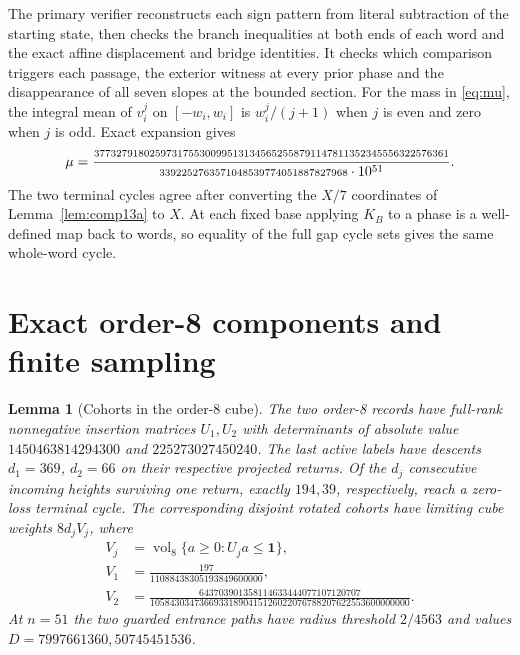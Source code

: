 \documentclass[11pt,reqno]{amsart}
\newtheorem{lemma}[theorem]{Lemma}
\theoremstyle{remark}
\begin{document}
The primary verifier reconstructs each sign pattern from literal
subtraction of the starting state, then checks the branch inequalities
at both ends of each word and the exact affine displacement
and bridge identities. It checks which comparison triggers
each passage, the exterior witness at every prior phase and
the disappearance of all seven slopes at the bounded section.
For the mass in \eqref{eq:mu}, the integral mean of
\(v_i^j\) on \([-w_i,w_i]\) is \(w_i^j/(j+1)\) when \(j\) is even
and zero when \(j\) is odd. Exact expansion gives
\[
\mu =
\frac{\mbox{\scriptsize 3773279180259731755300995131345652558791147811352345556322576361}}
     {\mbox{\scriptsize 3392252763571048539774051887827968}\cdot10^{51}}.
\]
The two terminal cycles agree after converting the
\(X/7\) coordinates of Lemma~\ref{lem:comp13a} to \(X\). At each fixed
base applying \(K_B\) to a phase is a well-defined map back to
words, so equality of the full gap cycle sets gives the same
whole-word cycle.

\section{Exact order-8 components and finite sampling}\label{app:cube}

\begin{lemma}[Cohorts in the order-8 cube]\label{lem:compcube}
The two order-8 records have full-rank nonnegative insertion
matrices \(U_1,U_2\) with determinants of absolute value
\(1450463814294300\) and \(225273027450240\).
The last active labels have descents \(d_1=369\), \(d_2=66\)
on their respective projected returns. Of the \(d_j\)
consecutive incoming heights surviving one return, exactly
\(194,39\), respectively, reach a zero-loss terminal cycle.
The corresponding disjoint rotated cohorts have limiting cube
weights \(8d_j V_j\), where
\[
\begin{split}
V_j&=\operatorname{vol}_8\{a\ge0:U_ja\le\mathbf1\},\\
V_1&=\frac{197}{11088438305193849600000},\\
V_2&=\frac{643703901358114633444077107120707}
 {10584303473669331890415126022076788207622553600000000}.
\end{split}
\]
At \(n=51\) the two guarded entrance paths have radius threshold
\(2/4563\) and values \(D=7997661360,50745451536\).
\end{lemma}
\end{document}
